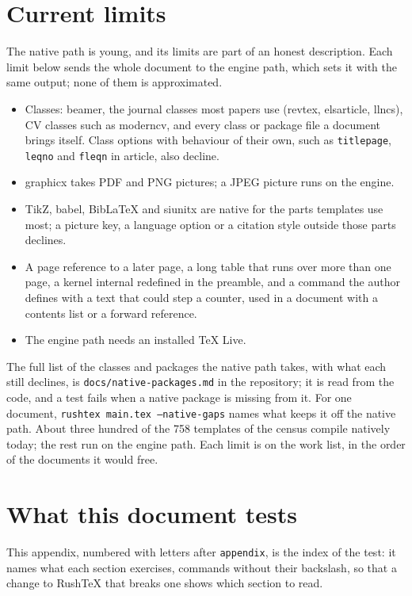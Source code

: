 \documentclass{article}
\numberwithin{equation}{section}
\theoremstyle{definition}
\theoremstyle{remark}
\begin{document}
\section{Current limits}\label{sec:limits}

The native path is young, and its limits are part of an honest description. Each
limit below sends the whole document to the engine path, which sets it with the same
output; none of them is approximated.

\begin{itemize}
  \item Classes: beamer, the journal classes most papers use (revtex, elsarticle,
        llncs), CV classes such as moderncv, and every class or package file a document
        brings itself. Class options with behaviour of their own, such as
        \texttt{titlepage}, \texttt{leqno} and \texttt{fleqn} in article, also decline.
  \item graphicx takes PDF and PNG pictures; a JPEG picture runs on the engine.
  \item TikZ, babel, BibLaTeX and siunitx are native for the parts templates use most; a
        picture key, a language option or a citation style outside those parts declines.
  \item A page reference to a later page, a long table that runs over more than one page,
        a kernel internal redefined in the preamble, and a command the author defines with
        a text that could step a counter, used in a document with a contents list or a
        forward reference.
  \item The engine path needs an installed \TeX{} Live.
\end{itemize}

The full list of the classes and packages the native path takes, with what each still
declines, is \texttt{docs/native-packages.md} in the repository; it is read from the code,
and a test fails when a native package is missing from it. For one document,
\texttt{rushtex main.tex --native-gaps} names what keeps it off the native path. About three
hundred of the 758 templates of the census compile natively today; the rest run on the
engine path. Each limit is on the work list, in the order of the documents it
would free.

\appendix

\section{What this document tests}\label{sec:tests}
This appendix, numbered with letters after \texttt{appendix}, is the index of the test: it
names what each section exercises, commands without their backslash, so that a change to
RushTeX that breaks one shows which section to read.
\end{document}
